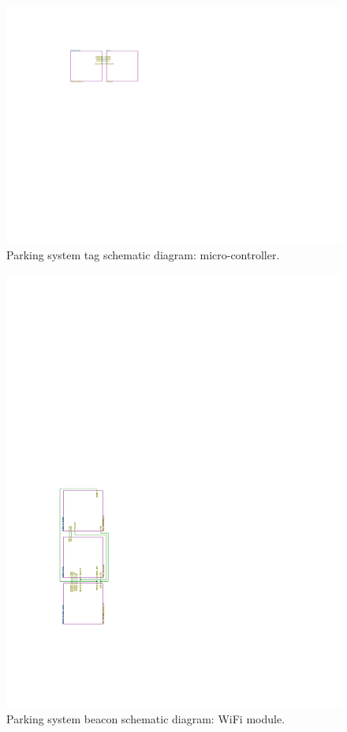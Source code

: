 \begin{figure}[H]
\begin{center}
\includegraphics[page=3,scale=1,trim={10cm 8cm 10cm 5cm},clip]{data/parking-system.pdf}
\caption{Parking system tag schematic diagram: micro-controller.}
\end{center}
\end{figure}

\begin{figure}[H]
\begin{center}
\includegraphics[page=4,scale=1,trim={5cm 9cm 10cm 13cm},clip,angle=-90]{data/parking-system2.pdf}
\caption{Parking system beacon schematic diagram: WiFi module.}
\label{fig:wifi}
\end{center}
\end{figure}

